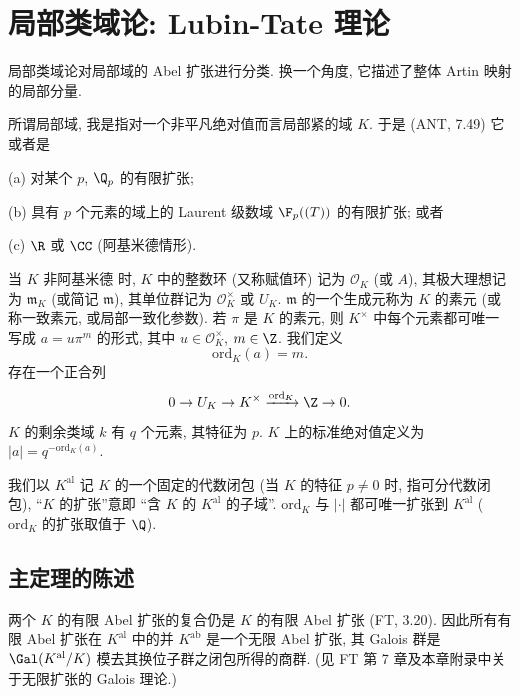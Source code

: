 \chapter{局部类域论: Lubin-Tate 理论}\label{ch:I}%

局部类域论对局部域的 Abel 扩张进行分类. 换一个角度, 它描述了整体 Artin 映射的局部分量.

所谓局部域, 我是指对一个非平凡绝对值而言局部紧的域 $K$. 于是 (ANT, 7.49) 它或者是

(a) 对某个 $p$, $\Q_p$ 的有限扩张;

(b) 具有 $p$ 个元素的域上的 Laurent 级数域 $\F_p((T))$ 的有限扩张; 或者

(c) $\R$ 或 $\CC$ (阿基米德情形).

当 $K$ 非阿基米德 时, $K$ 中的整数环 (又称赋值环) 记为 $\mathcal{O}_K$ (或 $A$), 其极大理想记为 $\mathfrak{m}_K$ (或简记 $\mathfrak{m}$), 其单位群记为 $\mathcal{O}_K^{\times}$ 或 $U_K$. $\mathfrak{m}$ 的一个生成元称为 $K$ 的素元 (或称一致素元, 或局部一致化参数). 若 $\pi$ 是 $K$ 的素元, 则 $K^{\times}$ 中每个元素都可唯一写成 $a=u\pi^m$ 的形式, 其中 $u\in\mathcal{O}_K^{\times}$, $m\in\Z$. 我们定义
\[
\mathrm{ord}_K(a)=m.
\]
存在一个正合列
\[
0\to U_K\to K^{\times}\xrightarrow{\mathrm{ord}_K}\Z\to 0.
\]
$K$ 的剩余类域 $k$ 有 $q$ 个元素, 其特征为 $p$. $K$ 上的标准绝对值定义为 $|a|=q^{-\mathrm{ord}_K(a)}$.

我们以 $K^{\mathrm{al}}$ 记 $K$ 的一个固定的代数闭包 (当 $K$ 的特征 $p\neq 0$ 时, 指可分代数闭包), “$K$ 的扩张”意即 “含 $K$ 的 $K^{\mathrm{al}}$ 的子域”. $\mathrm{ord}_K$ 与 $|\cdot|$ 都可唯一扩张到 $K^{\mathrm{al}}$ ($\mathrm{ord}_K$ 的扩张取值于 $\Q$).

\section{主定理的陈述}\label{sec:I.1}

两个 $K$ 的有限 Abel 扩张的复合仍是 $K$ 的有限 Abel 扩张 (FT, 3.20). 因此所有有限 Abel 扩张在 $K^{\mathrm{al}}$ 中的并 $K^{\mathrm{ab}}$ 是一个无限 Abel 扩张, 其 Galois 群是 $\Gal(K^{\mathrm{al}}/K)$ 模去其换位子群之闭包所得的商群. (见 FT 第 7 章及本章附录中关于无限扩张的 Galois 理论.)

